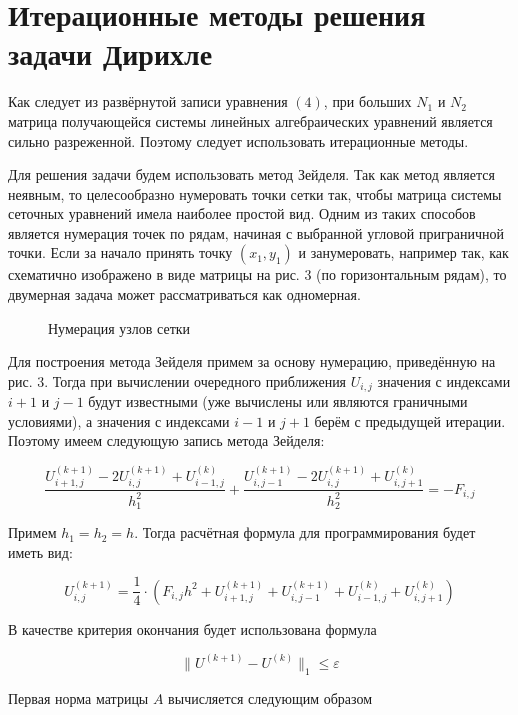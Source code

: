 \documentclass[a4paper, 12pt]{article} %
\begin{document}
\section{Итерационные методы решения задачи Дирихле}

Как следует из развёрнутой записи уравнения $ (4) $, при больших $ N_1 $ и $ N_2 $ матрица получающейся системы линейных алгебраических уравнений является сильно разреженной. Поэтому следует использовать итерационные методы.

Для решения задачи будем использовать метод Зейделя. Так как метод является неявным, то целесообразно нумеровать точки сетки так, чтобы матрица системы сеточных уравнений имела наиболее простой вид. Одним из таких способов является нумерация точек  по рядам, начиная с выбранной  угловой приграничной точки. Если за начало принять точку $ (x_1, y_1) $ и занумеровать, например так, как схематично изображено в виде матрицы на рис. 3 (по горизонтальным рядам), то двумерная задача может рассматриваться как одномерная.

\begin{figure}[h]
\caption{Нумерация узлов сетки}
\end{figure}

\newpage

Для построения метода Зейделя примем за основу нумерацию, приведённую на рис. 3. Тогда при вычислении очередного приближения $ U_{i, j} $ значения с индексами $ i + 1 $ и $ j - 1 $ будут известными (уже вычислены или являются граничными условиями), а значения с индексами $ i - 1 $ и $ j + 1 $ берём с предыдущей итерации. Поэтому имеем следующую запись метода Зейделя:

\[ \frac{U_{i + 1, j}^{(k + 1)} - 2U_{i, j}^{(k + 1)} + U_{i - 1, j}^{(k)}} {h_1^2} + 
\frac{U_{i, j - 1}^{(k + 1)} - 2U_{i, j}^{(k + 1)} + U_{i, j + 1}^{(k)}}{h_2^2} = - F_{i, j} \]

Примем $ h_1 = h_2 = h $. Тогда расчётная формула для программирования будет иметь вид:

\[ U_{i, j}^{(k + 1)} = \frac{1}{4} \cdot (F_{i, j} h^2 + U_{i + 1, j}^{(k + 1)} + U_{i, j - 1}^{(k + 1)} + U_{i - 1, j}^{(k)} + U_{i, j + 1}^{(k)} ) \]

В качестве критерия окончания будет использована формула

\[ \| U^{(k + 1)} - U^{(k)} \|_1 \leq \varepsilon \]

Первая норма матрицы $ A $ вычисляется следующим образом
\end{document}
